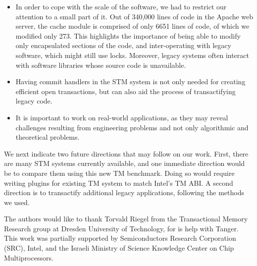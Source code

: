 \documentclass[preprint,11pt]{sigplanconf}
\begin{document}
\begin{itemize}

\item
In order to cope with the scale of the software, we had to restrict
our attention to a small part of it. 
Out of 340,000 lines of code in the Apache web server, the cache module
is comprised of only 6651 lines of code, of which we modified only 273. 
This highlights the importance of being able to modify only
encapsulated sections of the code, and inter-operating with legacy software,
which might still use locks.  Moreover, legacy systems often interact
with software libraries whose source code is unavailable. 

  \item Having commit handlers in the STM system is not only needed for creating
efficient open transactions, but can also aid the process of transactifying
legacy code.

  \item It is important to work on real-world applications, as they
may reveal challenges resulting from engineering problems and not only
algorithmic and theoretical problems.

\end{itemize}

We next indicate two future directions that may follow on our work. 
First, there are many STM systems currently available, and one immediate direction
would be to compare them using this new TM benchmark. Doing so would require writing
plugins for existing TM system to match Intel's TM ABI. 
A second direction is to transactify additional 
legacy applications, following the methods we used.



\acks

The authors would like to thank Torvald Riegel from the Transactional Memory Research
group at Dresden University of Technology, for is help with {\sc Tanger}. 
This work was partially supported by Semiconductors Research
Corporation (SRC), Intel, and the Israeli Ministry of Science
Knowledge Center on Chip Multiprocessors.



%
%


\end{document}
